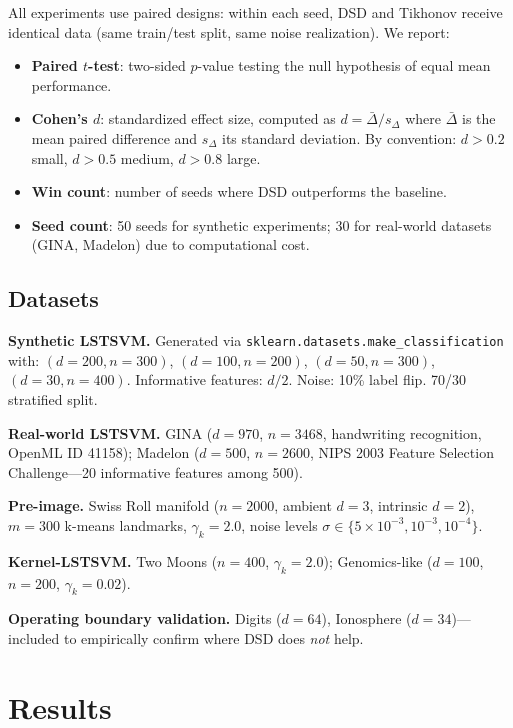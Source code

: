 \documentclass[preprint,review,12pt]{elsarticle}
\begin{document}
All experiments use paired designs: within each seed, DSD and Tikhonov receive identical data (same train/test split, same noise realization). We report:
\begin{itemize}
\item \textbf{Paired $t$-test}: two-sided $p$-value testing the null hypothesis of equal mean performance.
\item \textbf{Cohen's $d$}: standardized effect size, computed as $d = \bar{\Delta}/s_\Delta$ where $\bar{\Delta}$ is the mean paired difference and $s_\Delta$ its standard deviation. By convention: $d > 0.2$ small, $d > 0.5$ medium, $d > 0.8$ large.
\item \textbf{Win count}: number of seeds where DSD outperforms the baseline.
\item \textbf{Seed count}: 50 seeds for synthetic experiments; 30 for real-world datasets (GINA, Madelon) due to computational cost.
\end{itemize}

\subsection{Datasets}

\textbf{Synthetic LSTSVM.} Generated via \texttt{sklearn.datasets.make\_classification} with: $(d{=}200, n{=}300)$, $(d{=}100, n{=}200)$, $(d{=}50, n{=}300)$, $(d{=}30, n{=}400)$. Informative features: $d/2$. Noise: 10\% label flip. 70/30 stratified split.

\textbf{Real-world LSTSVM.} GINA ($d{=}970$, $n{=}3468$, handwriting recognition, OpenML ID 41158); Madelon ($d{=}500$, $n{=}2600$, NIPS 2003 Feature Selection Challenge---20 informative features among 500).

\textbf{Pre-image.} Swiss Roll manifold ($n{=}2000$, ambient $d{=}3$, intrinsic $d{=}2$), $m{=}300$ k-means landmarks, $\gamma_k{=}2.0$, noise levels $\sigma \in \{5{\times}10^{-3}, 10^{-3}, 10^{-4}\}$.

\textbf{Kernel-LSTSVM.} Two Moons ($n{=}400$, $\gamma_k{=}2.0$); Genomics-like ($d{=}100$, $n{=}200$, $\gamma_k{=}0.02$).

\textbf{Operating boundary validation.} Digits ($d{=}64$), Ionosphere ($d{=}34$)---included to empirically confirm where DSD does \emph{not} help.


\section{Results}
\label{sec:results}
\end{document}
